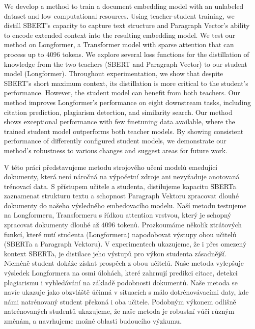 \documentclass[12pt]{report}
\begin{document}


We develop a method to train a document embedding model with an unlabeled
dataset and low computational resources. Using teacher-student training, we
distill SBERT's capacity to capture text structure and Paragraph Vector's
ability to encode extended context into the resulting embedding model. We test
our method on Longformer, a Transformer model with sparse attention that can
process up to 4096 tokens. We explore several loss functions for the
distillation of knowledge from the two teachers (SBERT and Paragraph Vector) to
our student model (Longformer). Throughout experimentation, we show that
despite SBERT's short maximum context, its distillation is more critical to the
student's performance. However, the student model can benefit from both
teachers. Our method improves Longformer's performance on eight downstream
tasks, including citation prediction, plagiarism detection, and similarity
search. Our method shows exceptional performance with few finetuning data
available, where the trained student model outperforms both teacher models. By
showing consistent performance of differently configured student models, we
demonstrate our method's robustness to various changes and suggest areas for
future work.


V této práci představujeme metodu strojového učení modelů emedující dokumenty,
která není náročná na výpočetní zdroje ani nevyžaduje anotovaná trénovací data.
S přístupem učitele a studenta, distilujeme kapacitu SBERTa zaznamenat
strukturu textu a schopnost Paragraph Vektoru zpracovat dlouhé dokumenty do
našeho výsledného embedovacího modelu. Naší metodu testujeme na Longformeru,
Transformeru s řídkou attention vrstvou, který je schopný zpracovat dokumenty
dlouhé až 4096 tokenů. Prozkoumáme několik ztrátových funkcí, které nutí
studenta (Longformera) napodobovat výstupy obou učitelů (SBERTa a Paragraph
Vektoru). V experimentech ukazujeme, že i přes omezený kontext SBERTa, je
distilace jeho výstupů pro výkon studenta zásadnější. Nicméně student dokáže
získat prospěch z obou učitelů. Naše metoda vylepšuje výsledek
Longformera na osmi úlohách, které zahrnují predikci citace, detekci
plagiarismu i vyhledávání na základě podobnosti dokumentů. Naše metoda se navíc
ukazuje jako obzvláště účinná v situacích s málo dotrénovávacími daty, kde námi
natrénovaný student překoná i oba učitele. Podobným výkonem odlišně
natrénovaných studentů ukazujeme, že naše metoda je robustní vůči různým
změnám, a navrhujeme možné oblasti budoucího výzkumu.
\end{document}
